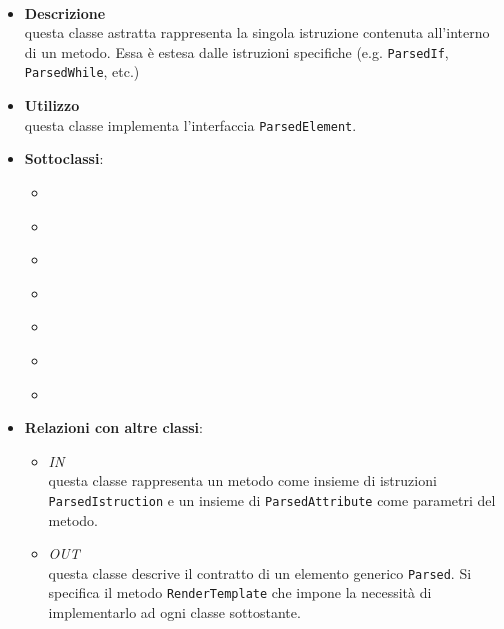 \paragraph{}
\label{\nogloxy{SWEDesigner::Server::Project::ParsedInstruction}}
\begin{itemize}
\item \textbf{Descrizione}\\
questa classe astratta rappresenta la singola istruzione contenuta all'interno di un metodo. Essa è estesa dalle istruzioni specifiche (e.g. \texttt{ParsedIf}, \texttt{ParsedWhile}, etc.)
\item \textbf{Utilizzo}\\
questa classe implementa l'interfaccia \texttt{ParsedElement}.
\item \textbf{Sottoclassi}:
\begin{itemize}
\item \hyperref[\nogloxy{SWEDesigner::Server::Project::ParsedAssignment}]{}
\item \hyperref[\nogloxy{SWEDesigner::Server::Project::ParsedCustom}]{}
\item \hyperref[\nogloxy{SWEDesigner::Server::Project::ParsedFor}]{}
\item \hyperref[\nogloxy{SWEDesigner::Server::Project::ParsedIf}]{}
\item \hyperref[\nogloxy{SWEDesigner::Server::Project::ParsedInitialize}]{}
\item \hyperref[\nogloxy{SWEDesigner::Server::Project::ParsedReturn}]{}
\item \hyperref[\nogloxy{SWEDesigner::Server::Project::ParsedWhile}]{}
\end{itemize}
\item \textbf{Relazioni con altre classi}:
\begin{itemize}
\item \textit{IN} \hyperref[\nogloxy{SWEDesigner::Server::Project::ParsedMethod}]{}\\
questa classe rappresenta un metodo come insieme di istruzioni \texttt{ParsedIstruction} e un insieme di \texttt{ParsedAttribute} come parametri del metodo.
\item \textit{OUT} \hyperref[\nogloxy{SWEDesigner::Server::Project::ParsedElement}]{}\\
questa classe descrive il contratto di un elemento generico \texttt{Parsed}. Si specifica il metodo \texttt{RenderTemplate} che impone la necessità di implementarlo ad ogni classe sottostante.
\end{itemize}
\end{itemize}

